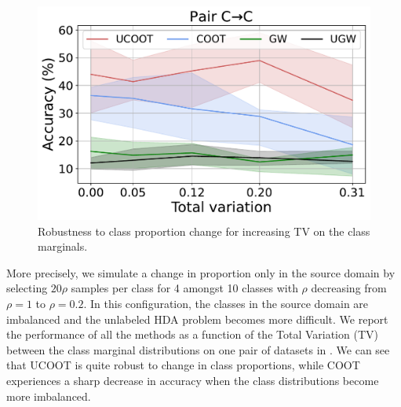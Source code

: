 \begin{figure}
  \centering
  \vspace{-10pt}
  \includegraphics[width=\linewidth]{./Chapitre3/fig/summary_C_C.pdf}
  \vspace*{-7mm}
  \caption{Robustness to class proportion change for increasing TV on the class marginals.
  \label{f:hda_prop}}
\end{figure}
More precisely, we simulate a change in proportion only in the source domain
by selecting $20\rho$ samples per class for 4 amongst 10 classes with $\rho$
decreasing from $\rho=1$ to $\rho=0.2$. In this configuration,
the classes in the source domain are imbalanced and the unlabeled HDA problem becomes more difficult.
We report the performance of all the methods as a function of the Total Variation (TV)
between the class marginal distributions on one pair of datasets in .
We can see that UCOOT is quite robust to change in class proportions,
while COOT experiences a sharp decrease in accuracy when the class distributions
become more imbalanced.

%
